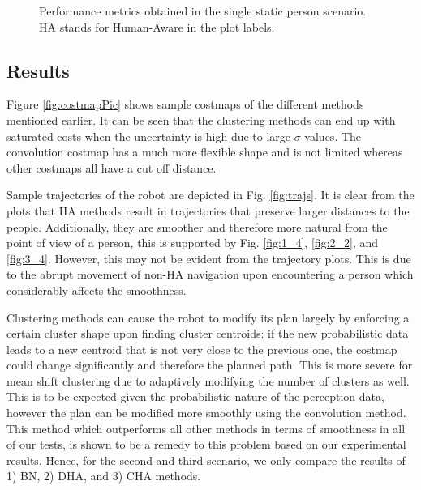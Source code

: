 \begin{figure}
\caption{Performance metrics obtained in the single static person scenario. HA stands for Human-Aware in the plot labels.
}
\label{fig:boxplots_singlePerson}
\end{figure}

\subsection{Results}
\label{sec:results}
Figure \ref{fig:costmapPic} shows sample costmaps of the different methods mentioned earlier. It can be seen that the clustering methods can end up with saturated costs when the uncertainty is high due to large $\sigma$ values. The convolution costmap has a much more flexible shape and is not limited whereas other costmaps all have a cut off distance.

Sample trajectories of the robot are depicted in Fig. \ref{fig:trajs}. It is clear from the plots that HA methods result in trajectories that preserve larger distances to the people. Additionally, they are smoother and therefore more natural from the point of view of a person, this is supported by Fig. \ref{fig:1_4}, \ref{fig:2_2}, and \ref{fig:3_4}. However, this may not be evident from the trajectory plots. This is due to the abrupt movement of non-HA navigation upon encountering a person which considerably affects the smoothness. 

Clustering methods can cause the robot to modify its plan largely by enforcing a certain cluster shape upon finding cluster centroids: if the new probabilistic data leads to a new centroid that is not very close to the previous one, the costmap could change significantly and therefore the planned path. This is more severe for mean shift clustering due to adaptively modifying the number of clusters as well. This is to be expected given the probabilistic nature of the perception data, however the plan can be modified more smoothly using the convolution method. This method which outperforms all other methods in terms of smoothness in all of our tests, is shown to be a remedy to this problem based on our experimental results. Hence, for the second and third scenario, we only compare the results of 1) BN, 2) DHA, and 3) CHA methods.  

